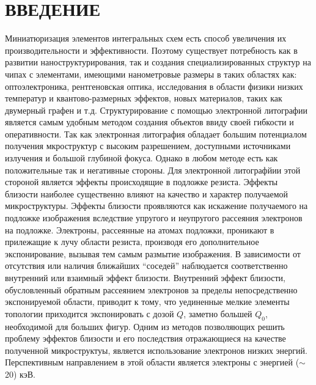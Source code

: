 \chapter*{ВВЕДЕНИЕ}
\vspace*{1cm}

Миниатюризация элементов интегральных схем есть способ увеличения их
производительности и эффективности. Поэтому существует потребность как
в развитии наноструктурирования, так и создания специализированных
структур на чипах с элементами, имеющими нанометровые размеры в таких
областях как: оптоэлектроника, рентгеновская оптика, исследования в
области физики низких температур и квантово-размерных эффектов, новых
материалов, таких как двумерный графен и т.д.
Структурирование с помощью электронной литографии является самым
удобным методом создания объектов ввиду своей гибкости и оперативности.
Так как электронная литография обладает большим потенциалом получения 
мкроструктур с высоким разрешением, доступными источниками излучения и
большой глубиной фокуса. Однако в любом методе есть как положительные 
так и негативные стороны. Для электронной литографйии этой стороной 
является эффекты происходящие в подложке резиста. Эффекты близости
наиболее существенно влияют на качество и характер получаемой
микроструктуры. Эффекты близости проявляются как искажение получаемого 
на подложке изображения вследствие упругого и неупругого рассеяния 
электронов на подложке. Электроны, рассеянные на атомах подложки, 
проникают в прилежащие к лучу области резиста, производя его 
дополнительное экспонирование, вызывая тем самым размытие изображения.
В зависимости от отсутствия или наличия ближайших “соседей” наблюдается 
соответственно внутренний или взаимный эффект близости. Внутренний эффект 
близости, обусловленный обратным рассеянием электронов за пределы 
непосредственно экспонируемой области, приводит к тому, что уединенные 
мелкие элементы топологии приходится экспонировать с дозой $Q$, заметно 
большей $Q_0$, необходимой для больших фигур. 
Одним из методов позволяющих решить проблему эффектов близости и
его последствия отражающиеся на качестве полученной микроструктуы, 
является использование электронов низких энергий. Перспективным 
направлением в этой области является электроны с энергией (\(\sim\)20) кэВ.









